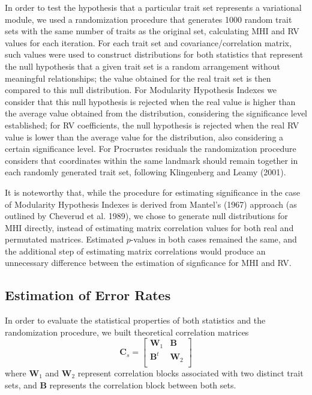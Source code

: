 \documentclass[12pt,]{article}
\begin{document}
In order to test the hypothesis that a particular trait set represents a
variational module, we used a randomization procedure that generates
1000 random trait sets with the same number of traits as the original
set, calculating MHI and RV values for each iteration. For each trait
set and covariance/correlation matrix, such values were used to
construct distributions for both statistics that represent the null
hypothesis that a given trait set is a random arrangement without
meaningful relationships; the value obtained for the real trait set is
then compared to this null distribution. For Modularity Hypothesis
Indexes we consider that this null hypothesis is rejected when the real
value is higher than the average value obtained from the distribution,
considering the significance level established; for RV coefficients, the
null hypothesis is rejected when the real RV value is lower than the
average value for the distribution, also considering a certain
significance level. For Procrustes residuals the randomization procedure
considers that coordinates within the same landmark should remain
together in each randomly generated trait set, following Klingenberg and
Leamy (2001).

It is noteworthy that, while the procedure for estimating significance
in the case of Modularity Hypothesis Indexes is derived from Mantel's
(1967) approach (as outlined by Cheverud et al. 1989), we chose to
generate null distributions for MHI directly, instead of estimating
matrix correlation values for both real and permutated matrices.
Estimated $p$-values in both cases remained the same, and the additional
step of estimating matrix correlations would produce an unnecessary
difference between the estimation of signficance for MHI and RV.

\subsection{Estimation of Error Rates}\label{estimation-of-error-rates}

In order to evaluate the statistical properties of both statistics and
the randomization procedure, we built theoretical correlation matrices
\[
\mathbf{C}_{s} =
\begin{bmatrix}
\mathbf{W}_1 & \mathbf{B} \\
\mathbf{B}^t & \mathbf{W}_2 \\
\end{bmatrix}
\] where $\mathbf{W}_1$ and $\mathbf{W}_2$ represent correlation blocks
associated with two distinct trait sets, and $\mathbf{B}$ represents the
correlation block between both sets.
\end{document}
